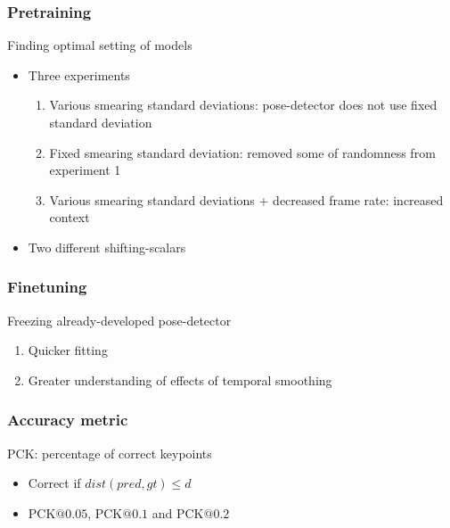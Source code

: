 \documentclass{beamer}
\begin{document}
\begin{frame}
    \frametitle{Pretraining}
    Finding optimal setting of models
    \begin{itemize}
        \item<1-> Three experiments
        \begin{enumerate}
            \item<1-> Various smearing standard deviations: pose-detector does not use fixed standard deviation
            \item<2-> Fixed smearing standard deviation: removed some of randomness from experiment 1
            \item<3-> Various smearing standard deviations + decreased frame rate: increased context
        \end{enumerate}
        \item<4-> Two different shifting-scalars
    \end{itemize}
\end{frame}

\begin{frame}
    \frametitle{Finetuning}
    Freezing already-developed pose-detector
        \begin{enumerate}
            \item Quicker fitting
            \item Greater understanding of effects of temporal smoothing
        \end{enumerate}
\end{frame}

\begin{frame}
    \frametitle{Accuracy metric}
    PCK: percentage of correct keypoints
    \begin{itemize}
        \item Correct if $dist(pred, gt) \leq d$
        \item PCK$@0.05$, PCK$@0.1$ and PCK$@0.2$ 
    \end{itemize}
\end{frame}
\end{document}

